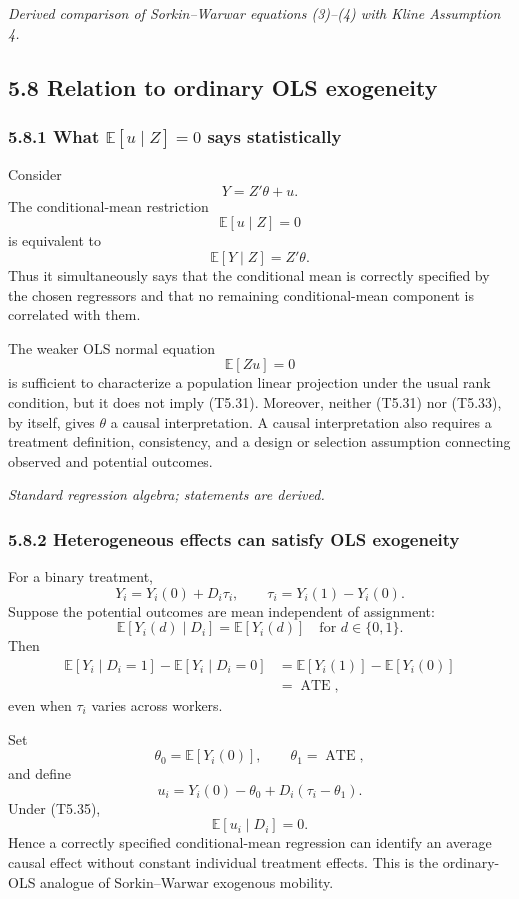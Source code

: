 \documentclass[11pt]{article}
\begin{document}
\textit{Derived comparison of Sorkin--Warwar equations (3)--(4) with Kline
Assumption 4.}

\subsection{5.8 Relation to ordinary OLS exogeneity}

\subsubsection{5.8.1 What \(\mathbb E[u\mid Z]=0\) says statistically}

Consider
\[
Y=Z'\theta+u.
\tag{T5.30}
\]
The conditional-mean restriction
\[
\mathbb E[u\mid Z]=0
\tag{T5.31}
\]
is equivalent to
\[
\mathbb E[Y\mid Z]=Z'\theta.
\tag{T5.32}
\]
Thus it simultaneously says that the conditional mean is correctly
specified by the chosen regressors and that no remaining conditional-mean
component is correlated with them.

The weaker OLS normal equation
\[
\mathbb E[Zu]=0
\tag{T5.33}
\]
is sufficient to characterize a population linear projection under the
usual rank condition, but it does not imply (T5.31).  Moreover, neither
(T5.31) nor (T5.33), by itself, gives \(\theta\) a causal interpretation.
A causal interpretation also requires a treatment definition, consistency,
and a design or selection assumption connecting observed and potential
outcomes.

\textit{Standard regression algebra; statements are derived.}

\subsubsection{5.8.2 Heterogeneous effects can satisfy OLS exogeneity}

For a binary treatment,
\[
Y_i
=
Y_i(0)+D_i\tau_i,
\qquad
\tau_i=Y_i(1)-Y_i(0).
\tag{T5.34}
\]
Suppose the potential outcomes are mean independent of assignment:
\[
\mathbb E[Y_i(d)\mid D_i]
=
\mathbb E[Y_i(d)]
\quad
\text{for }d\in\{0,1\}.
\tag{T5.35}
\]
Then
\[
\begin{aligned}
\mathbb E[Y_i\mid D_i=1]
-\mathbb E[Y_i\mid D_i=0]
&=
\mathbb E[Y_i(1)]-\mathbb E[Y_i(0)]\\
&=
\operatorname{ATE},
\end{aligned}
\tag{T5.36}
\]
even when \(\tau_i\) varies across workers.

Set
\[
\theta_0=\mathbb E[Y_i(0)],
\qquad
\theta_1=\operatorname{ATE},
\tag{T5.37}
\]
and define
\[
u_i
=
Y_i(0)-\theta_0
+D_i(\tau_i-\theta_1).
\tag{T5.38}
\]
Under (T5.35),
\[
\mathbb E[u_i\mid D_i]=0.
\tag{T5.39}
\]
Hence a correctly specified conditional-mean regression can identify an
average causal effect without constant individual treatment effects.  This
is the ordinary-OLS analogue of Sorkin--Warwar exogenous mobility.
\end{document}
